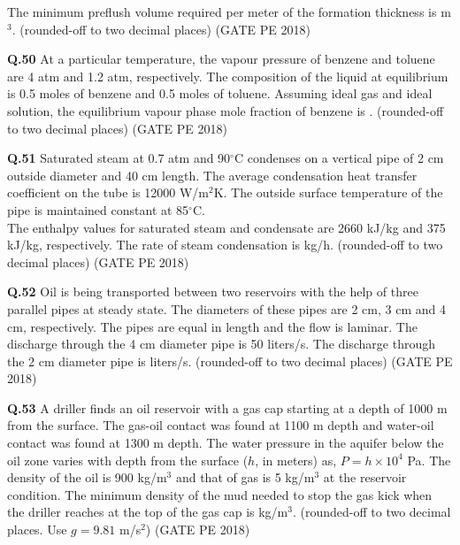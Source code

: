 \documentclass[12pt,a4paper]{article}
\begin{document}
The minimum preflush volume required per meter of the formation thickness is \underline{\hspace{2cm}} m$^3$. (rounded-off to two decimal places) \hfill (GATE PE 2018)

\vspace{1cm}

\noindent\textbf{Q.50} At a particular temperature, the vapour pressure of benzene and toluene are 4 atm and 1.2 atm, respectively. The composition of the liquid at equilibrium is 0.5 moles of benzene and 0.5 moles of toluene. Assuming ideal gas and ideal solution, the equilibrium vapour phase mole fraction of benzene is \underline{\hspace{2cm}}. (rounded-off to two decimal places) \hfill (GATE PE 2018)

\pagebreak

\noindent\textbf{Q.51} Saturated steam at 0.7 atm and 90$^\circ$C condenses on a vertical pipe of 2 cm outside diameter and 40 cm length. The average condensation heat transfer coefficient on the tube is 12000 W/m$^2$K. The outside surface temperature of the pipe is maintained constant at 85$^\circ$C. \\ 
The enthalpy values for saturated steam and condensate are 2660 kJ/kg and 375 kJ/kg, respectively. The rate of steam condensation is \underline{\hspace{2cm}} kg/h. (rounded-off to two decimal places) \hfill (GATE PE 2018)

\vspace{1cm}

\noindent\textbf{Q.52} Oil is being transported between two reservoirs with the help of three parallel pipes at steady state. The diameters of these pipes are 2 cm, 3 cm and 4 cm, respectively. The pipes are equal in length and the flow is laminar. The discharge through the 4 cm diameter pipe is 50 liters/s. The discharge through the 2 cm diameter pipe is \underline{\hspace{2cm}} liters/s. (rounded-off to two decimal places) \hfill (GATE PE 2018)

\vspace{1cm}

\noindent\textbf{Q.53} A driller finds an oil reservoir with a gas cap starting at a depth of 1000 m from the surface. The gas-oil contact was found at 1100 m depth and water-oil contact was found at 1300 m depth. The water pressure in the aquifer below the oil zone varies with depth from the surface ($h$, in meters) as, $P = h \times 10^4$ Pa. The density of the oil is 900 kg/m$^3$ and that of gas is 5 kg/m$^3$ at the reservoir condition. The minimum density of the mud needed to stop the gas kick when the driller reaches at the top of the gas cap is \underline{\hspace{2cm}} kg/m$^3$. (rounded-off to two decimal places. Use $g = 9.81$ m/s$^2$) \hfill (GATE PE 2018)
\end{document}
